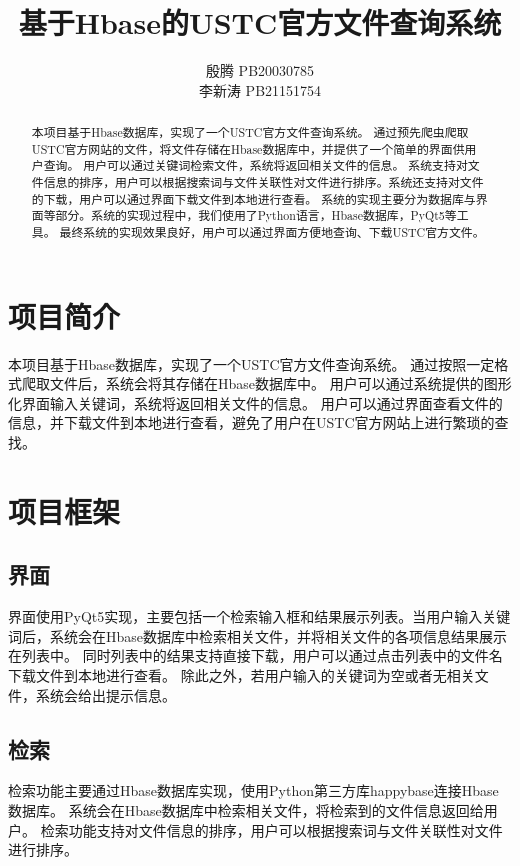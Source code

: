\documentclass{article}
\title{\bfseries 基于Hbase的USTC官方文件查询系统}
\author{殷腾 \quad PB20030785\\
	李新涛 \quad PB21151754}
\begin{document}
	\maketitle
	\begin{abstract}
		本项目基于Hbase数据库，实现了一个USTC官方文件查询系统。
		通过预先爬虫爬取USTC官方网站的文件，将文件存储在Hbase数据库中，并提供了一个简单的界面供用户查询。
		用户可以通过关键词检索文件，系统将返回相关文件的信息。
		系统支持对文件信息的排序，用户可以根据搜索词与文件关联性对文件进行排序。系统还支持对文件的下载，用户可以通过界面下载文件到本地进行查看。
		系统的实现主要分为数据库与界面等部分。系统的实现过程中，我们使用了Python语言，Hbase数据库，PyQt5等工具。
		最终系统的实现效果良好，用户可以通过界面方便地查询、下载USTC官方文件。
	\end{abstract}

	\tableofcontents
	\clearpage
	
	
	\section{项目简介}
	本项目基于Hbase数据库，实现了一个USTC官方文件查询系统。
	通过按照一定格式爬取文件后，系统会将其存储在Hbase数据库中。
	用户可以通过系统提供的图形化界面输入关键词，系统将返回相关文件的信息。
	用户可以通过界面查看文件的信息，并下载文件到本地进行查看，避免了用户在USTC官方网站上进行繁琐的查找。

	\section{项目框架}
	\subsection{界面}
	界面使用PyQt5实现，主要包括一个检索输入框和结果展示列表。当用户输入关键词后，系统会在Hbase数据库中检索相关文件，并将相关文件的各项信息结果展示在列表中。
	同时列表中的结果支持直接下载，用户可以通过点击列表中的文件名下载文件到本地进行查看。
	除此之外，若用户输入的关键词为空或者无相关文件，系统会给出提示信息。
	
	\subsection{检索}
	检索功能主要通过Hbase数据库实现，使用Python第三方库happybase连接Hbase数据库。
	系统会在Hbase数据库中检索相关文件，将检索到的文件信息返回给用户。
	检索功能支持对文件信息的排序，用户可以根据搜索词与文件关联性对文件进行排序。
	
\end{document}
